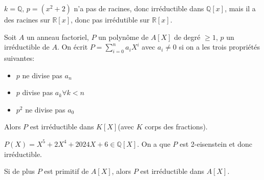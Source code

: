 \begin{exemple}
    $k = \mathbb{Q}, \,p = (x^2 + 2 )$ n'a pas de racines, donc irréductible dans $\mathbb{Q}[x]$, mais il a des racines sur $\mathbb{R}[x]$, donc pas irrédutible sur $\mathbb{R}[x]$.
\end{exemple}


\begin{theorem}
	Soit $A$ un anneau factoriel, $P$ un polynôme  de $A[X]$ de degré $\geq 1$, $p$ un irréductible de $A$.
	On écrit $P = \sum_{i=0}^n a_iX^i$ avec $a_i \neq 0$ si on a les trois propriétés suivantes:
	\begin{itemize}
		\item $p$ ne divise pas $a_n$
		\item $p$ divise pas $a_k \forall k < n$
		\item $p^2$ ne divise pas $a_0$
	\end{itemize}
	Alors $P$ est irréductible dans $K[X]$(avec $K$ corps des fractions).
\end{theorem}

\begin{exemple}
	$P(X) = X^5 + 2X^4 + 2024X + 6\in \mathbb{Q}[X]$. On a que $P$ est 2-eisenstein et donc irréductible.
\end{exemple}



\begin{coro}
	Si de plus $P$ est primitif de $A[X]$, alors $P$ est irréductible dans $A[X]$.
\end{coro}
